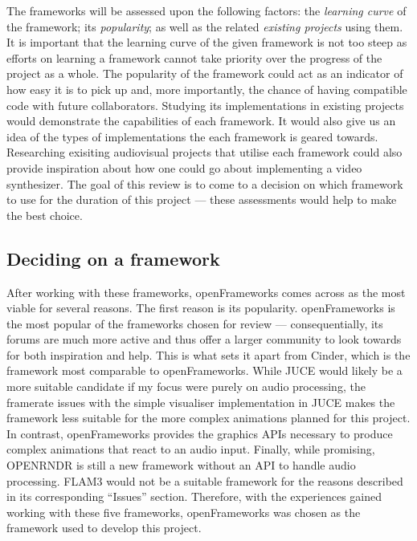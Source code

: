 \documentclass[../initial_thesis.tex]{subfiles}
\begin{document}
The frameworks will be assessed upon the following factors: the \emph{learning curve} of the framework; its \emph{popularity}; as well as the related \emph{existing projects} using them. It is important that the learning curve of the given framework is not too steep as efforts on learning a framework cannot take priority over the progress of the project as a whole. The popularity of the framework could act as an indicator of how easy it is to pick up and, more importantly, the chance of having compatible code with future collaborators. Studying its implementations in existing projects would demonstrate the capabilities of each framework. It would also give us an idea of the types of implementations the each framework is geared towards. Researching exisiting audiovisual projects that utilise each framework could also provide inspiration about how one could go about implementing a video synthesizer. The goal of this review is to come to a decision on which framework to use for the duration of this project --- these assessments would help to make the best choice.







\subsection{Deciding on a framework}
After working with these frameworks, openFrameworks comes across as the most viable for several reasons. The first reason is its popularity. openFrameworks is the most popular of the frameworks chosen for review --- consequentially, its forums are much more active and thus offer a larger community to look towards for both inspiration and help. This is what sets it apart from Cinder, which is the framework most comparable to openFrameworks. While JUCE would likely be a more suitable candidate if my focus were purely on audio processing, the framerate issues with the simple visualiser implementation in JUCE makes the framework less suitable for the more complex animations planned for this project. In contrast, openFrameworks provides the graphics APIs necessary to produce complex animations that react to an audio input. Finally, while promising, OPENRNDR is still a new framework without an API to handle audio processing. FLAM3 would not be a suitable framework for the reasons described in its corresponding ``Issues'' section. Therefore, with the experiences gained working with these five frameworks, openFrameworks was chosen as the framework used to develop this project.
\end{document}
